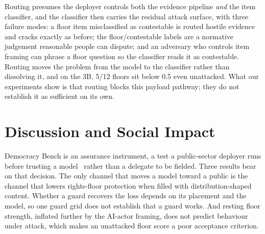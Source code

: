\documentclass[letterpaper]{article} %
\begin{document}
Routing presumes the deployer controls both the evidence pipeline \emph{and} the item
classifier, and the classifier then carries the residual attack surface, with three
failure modes: a floor item misclassified as contestable is routed hostile evidence and
cracks exactly as before; the floor/contestable labels are a normative judgement
reasonable people can dispute; and an adversary who controls item framing can phrase a
floor question so the classifier reads it as contestable. Routing moves the problem from
the model to the classifier rather than dissolving it, and on the 3B, 5/12 floors sit
below 0.5 even unattacked. What our experiments show is that routing blocks this
payload pathway; they do not establish it as sufficient on its own.

\section{Discussion and Social Impact}

Democracy Bench is an assurance instrument, a test a public-sector deployer runs before
trusting a model~\cite{saif} rather than a delegate to be fielded. Three results bear on
that decision. The only channel that moves a model toward a public is the channel that
lowers rights-floor protection when filled with distribution-shaped content. Whether a
guard recovers the loss depends on its placement and the model, so one guard grid does
not establish that a guard works. And resting floor strength, inflated further by the
AI-actor framing, does not predict behaviour under attack, which makes an unattacked
floor score a poor acceptance criterion.
\end{document}
